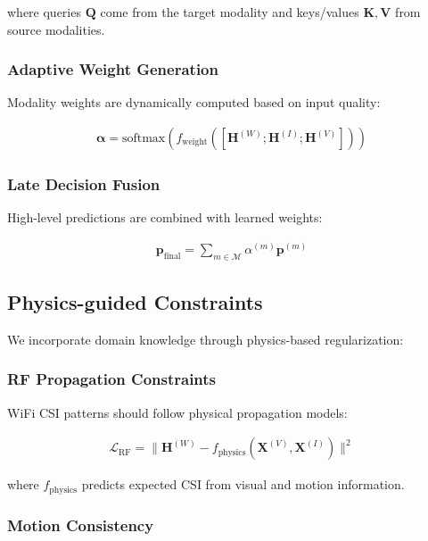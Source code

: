 \documentclass[journal]{IEEEtran}
\begin{document}
where queries $\mathbf{Q}$ come from the target modality and keys/values $\mathbf{K}, \mathbf{V}$ from source modalities.

\subsubsection{Adaptive Weight Generation}

Modality weights are dynamically computed based on input quality:

\begin{align}
\boldsymbol{\alpha} = \text{softmax}(f_{\text{weight}}([\mathbf{H}^{(W)}; \mathbf{H}^{(I)}; \mathbf{H}^{(V)}]))
\end{align}

\subsubsection{Late Decision Fusion}

High-level predictions are combined with learned weights:

\begin{align}
\mathbf{p}_{\text{final}} = \sum_{m \in \mathcal{M}} \alpha^{(m)} \mathbf{p}^{(m)}
\end{align}

\subsection{Physics-guided Constraints}

We incorporate domain knowledge through physics-based regularization:

\subsubsection{RF Propagation Constraints}

WiFi CSI patterns should follow physical propagation models:

\begin{align}
\mathcal{L}_{\text{RF}} = \|\mathbf{H}^{(W)} - f_{\text{physics}}(\mathbf{X}^{(V)}, \mathbf{X}^{(I)})\|^2
\end{align}

where $f_{\text{physics}}$ predicts expected CSI from visual and motion information.

\subsubsection{Motion Consistency}
\end{document}
